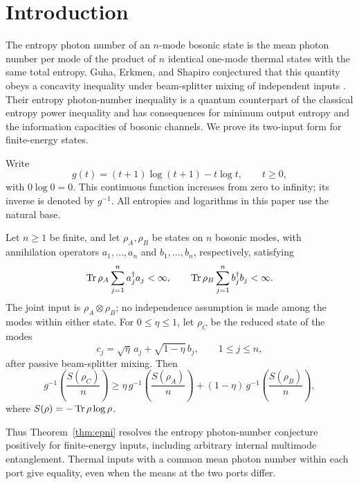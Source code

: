 \section{Introduction}\label{sec:introduction}
The entropy photon number of an \(n\)-mode bosonic state is the mean photon number per mode of the product of \(n\) identical one-mode thermal states with the same total entropy. Guha, Erkmen, and Shapiro conjectured that this quantity obeys a concavity inequality under beam-splitter mixing of independent inputs \cite{GES2007}. Their entropy photon-number inequality is a quantum counterpart of the classical entropy power inequality and has consequences for minimum output entropy and the information capacities of bosonic channels. We prove its two-input form for finite-energy states.

Write
\begin{equation}\label{eq:g-definition}
 g(t)=(t+1)\log(t+1)-t\log t,\qquad t\ge0,
\end{equation}
with \(0\log0=0\). This continuous function increases from zero to infinity; its inverse is denoted by \(g^{-1}\). All entropies and logarithms in this paper use the natural base.

\begin{theorem}\label{thm:epni}
Let \(n\ge1\) be finite, and let \(\rho_A,\rho_B\) be states on \(n\) bosonic modes, with annihilation operators \(a_1,\ldots,a_n\) and \(b_1,\ldots,b_n\), respectively, satisfying
\[
 \operatorname{Tr}\rho_A\sum_{j=1}^n a_j^\dagger a_j<\infty,
 \qquad
 \operatorname{Tr}\rho_B\sum_{j=1}^n b_j^\dagger b_j<\infty.
\]
The joint input is \(\rho_A\otimes\rho_B\); no independence assumption is made among the modes within either state. For \(0\le\eta\le1\), let \(\rho_C\) be the reduced state of the modes
\[
 c_j=\sqrt\eta\,a_j+\sqrt{1-\eta}\,b_j,\qquad 1\le j\le n,
\]
after passive beam-splitter mixing. Then
\begin{equation}\label{eq:epni}
 g^{-1}\!\left(\frac{S(\rho_C)}n\right)
 \ge \eta\,g^{-1}\!\left(\frac{S(\rho_A)}n\right)
 +(1-\eta)\,g^{-1}\!\left(\frac{S(\rho_B)}n\right),
\end{equation}
where \(S(\rho)=-\operatorname{Tr}\rho\log\rho\).
\end{theorem}

Thus Theorem~\ref{thm:epni} resolves the entropy photon-number conjecture positively for finite-energy inputs, including arbitrary internal multimode entanglement. Thermal inputs with a common mean photon number within each port give equality, even when the means at the two ports differ.

